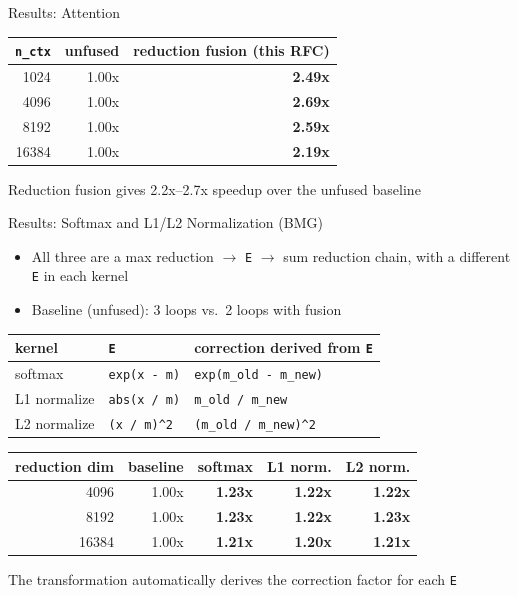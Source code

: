 \documentclass[10pt, aspectratio=169]{beamer}
\newcommand{\code}[1]{\texttt{\small #1}}
\newcommand{\takeawaybox}[2][inteltitle!12]{%
  \colorbox{#1}{%
    \parbox{\dimexpr\textwidth-2\fboxsep\relax}{\centering\vspace{1mm}
      #2\vspace{1mm}}}}
\newcommand{\takeaway}[1]{\par\vspace{2mm}\noindent\takeawaybox{#1}\par\vspace{2.5mm}}
\begin{document}
\begin{frame}{Results: Attention}
  \centering
  \begin{tabular}{rrr}
    \toprule
    \code{n\_ctx} & unfused & reduction fusion (this RFC) \\
    \midrule
    1024  & 1.00x & \textbf{2.49x} \\
    4096  & 1.00x & \textbf{2.69x} \\
    8192  & 1.00x & \textbf{2.59x} \\
    16384 & 1.00x & \textbf{2.19x} \\
    \bottomrule
  \end{tabular}

  \vspace{5mm}
  \takeaway{Reduction fusion gives \alert{2.2x--2.7x} speedup over the unfused
    baseline}
\end{frame}

\begin{frame}{Results: Softmax and L1/L2 Normalization (BMG)}
  \begin{itemize}\small
    \item All three are a max reduction $\rightarrow$ \code{E} $\rightarrow$ sum
      reduction chain, with a different \code{E} in each kernel
    \item Baseline (unfused): 3 loops vs.\ 2 loops with fusion
  \end{itemize}

  \vspace{1mm}
  \centering
  \scriptsize
  \begin{tabular}{lll}
    \toprule
    kernel & \code{E} & correction derived from \code{E} \\
    \midrule
    softmax      & \code{exp(x - m)}   & \code{exp(m\_old - m\_new)} \\
    L1 normalize & \code{abs(x / m)}   & \code{m\_old / m\_new} \\
    L2 normalize & \code{(x / m)\^{}2} & \code{(m\_old / m\_new)\^{}2} \\
    \bottomrule
  \end{tabular}

  \vspace{1mm}
  \small
  \begin{tabular}{rrrrr}
    \toprule
    reduction dim & baseline & softmax & L1 norm. & L2 norm. \\
    \midrule
    4096  & 1.00x & \textbf{1.23x} & \textbf{1.22x} & \textbf{1.22x} \\
    8192  & 1.00x & \textbf{1.23x} & \textbf{1.22x} & \textbf{1.23x} \\
    16384 & 1.00x & \textbf{1.21x} & \textbf{1.20x} & \textbf{1.21x} \\
    \bottomrule
  \end{tabular}

  \takeaway{The transformation automatically derives the correction factor for
    each \code{E}}
\end{frame}
\end{document}
